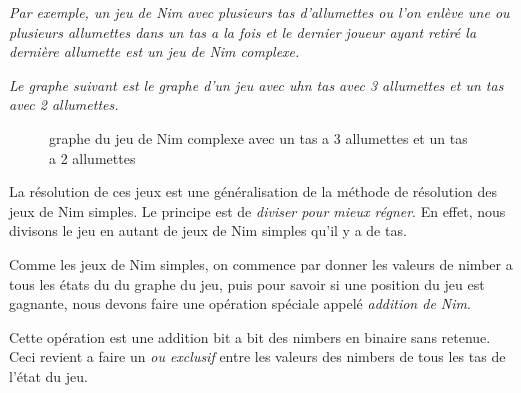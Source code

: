    \textit{
      Par exemple, un jeu de Nim avec plusieurs tas d'allumettes ou l'on enlève une ou plusieurs allumettes dans un tas a la fois et le dernier joueur ayant retiré la dernière allumette est un jeu de Nim complexe.
    }

    \textit{
      Le graphe suivant est le graphe d'un jeu avec uhn tas avec 3 allumettes et un tas avec 2 allumettes.
    }

     \begin{figure}[h]
      \centering
      \caption{graphe du jeu de Nim complexe avec un tas a 3 allumettes et un tas a 2 allumettes}
    \end{figure}

    La résolution de ces jeux est une généralisation de la méthode de résolution des jeux de Nim simples. Le principe est de \textit{diviser pour mieux régner}. En effet, nous divisons le jeu en autant de jeux de Nim simples qu'il y a de tas.

    Comme les jeux de Nim simples, on commence par donner les valeurs de nimber a tous les états du du graphe du jeu, puis pour savoir si une position du jeu est gagnante, nous devons faire une opération spéciale appelé \textit{addition de Nim}.

    Cette opération est une addition bit a bit des nimbers en binaire sans retenue. Ceci revient a faire un \textit{ou exclusif} entre les valeurs des nimbers de tous les tas de l’état du jeu.

